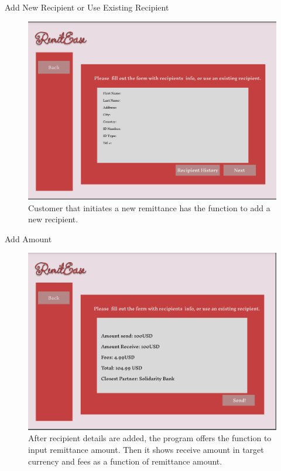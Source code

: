 \documentclass{beamer}
\begin{document}
\begin{frame}{Add New Recipient or Use Existing Recipient}
    \begin{figure}
        \centering
        \includegraphics[width=.7\linewidth]{MockUps/3ReceipientsInfoForm.PNG}
        \caption{Customer that initiates a new remittance has the function to add a new recipient.}
        \label{fig:enter-label}
    \end{figure}
\end{frame}

\begin{frame}{Add Amount}
    \begin{figure}
        \centering
        \includegraphics[width=.7\linewidth]{MockUps/AmountScreen.PNG}
        \caption{After recipient details are added, the program offers the function to input remittance amount. Then it shows receive amount in target currency and fees as a function of remittance amount.}
        \label{fig:enter-label}
    \end{figure}
\end{frame}
\end{document}

